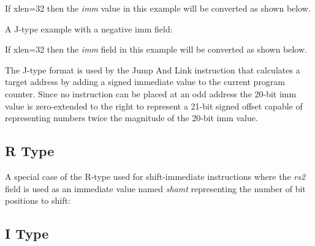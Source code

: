 If \Gls{xlen}=32 then the {\em imm} value in this example will be converted as 
shown below.


%

A J-type example with a negative imm field:


If \Gls{xlen}=32 then the {\em imm} field in this example will be converted as 
shown below.


%

The J-type format is used by the Jump And Link instruction that calculates 
a target address by adding a signed immediate value to the current program 
counter.  Since no instruction can be placed at an odd address the 20-bit 
imm value is zero-extended to the right to represent a 21-bit signed offset 
capable of representing numbers twice the magnitude of the 20-bit imm value.


\subsection{R Type}
\label{insnformat:rtype}

A special case of the R-type used for shift-immediate instructions where 
the {\em rs2} field is used as an immediate value named {\em shamt} 
representing the number of bit positions to shift:


\subsection{I Type}
\label{insnformat:itype}

